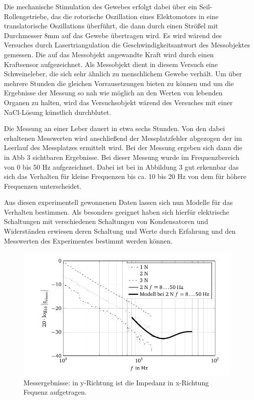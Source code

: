 \documentclass[11pt]{article}
\begin{document}
		 Die mechanische Stimulation des Gewebes erfolgt dabei über ein Seil-Rollengetriebe, das 
		 die rotorische Oszillation eines Elektomotors in eine translatorische Oszillations 	
		 überführt, die dann durch einen Strößel mit Durchmesser 8mm auf das Gewebe übertragen 
		 wird. Es wird wärend des Versuches durch Lasertriangulation die Geschwindigkeitsantwort 
		 des Messobjektes gemessen. Die auf das 
		 Messobjekt angewandte Kraft wird durch einen Kraftsensor aufgezeichnet. Als Messobjekt 
		 dient in diesem Versuch eine Schweineleber, die sich sehr ähnlich zu menschlichem Gewebe 
		 verhält. Um über mehrere Stunden die gleichen Vorrausetzungen bieten zu können und um die 
		 Ergebnisse der Messung so nah wie möglich an den Werten von lebenden Organen zu halten, 
		 wird das Versuchsobjekt wärend des Versuches mit einer NaCl-Lösung künstlich durchblutet.
		 
		 Die Messung an einer Leber dauert in etwa sechs Stunden. Von den dabei erhaltenen 
		 Messwerten wird anschließend der Messplatzfehler abgezogen der im Leerlauf des Messplatzes 
		 ermittelt wird. Bei der Messung ergeben sich dann die in Abb 3 sichtbaren Ergebnisse. Bei 
		 dieser Messung wurde im Frequenzbereich von 0 bis 50 Hz  aufgezeichnet. Dabei ist bei 
		 in Abbildung 3 gut erkennbar das sich das Verhalten für kleine Frequenzen bis ca. 10 bis 	
		 20 Hz von dem für höhere Frequenzen unterscheidet. 
		 
		 Aus diesen experimentell gewonnenen Daten lassen sich nun Modelle für das Verhalten 
		 bestimmen. Als besonders geeignet haben sich hierfür elektrische Schaltungen mit 
		 verschiedenen Schaltungen von Kondensatoren und Widerständen erwiesen deren Schaltung 
		 und Werte durch Erfahrung und den Messwerten des Experimentes bestimmt werden können.
		  
		 
		 \begin{figure}
		  \centering
			\includegraphics[width=\textwidth]{messerg.png}
			\caption{Messergebnisse: in y-Richtung ist die Impedanz in x-Richtung Fequenz aufgetragen.}
		\end{figure} 
		
\end{document}
